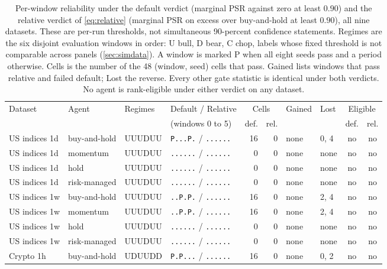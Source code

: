 \begin{table}[t]
\centering
\footnotesize
\caption{Per-window reliability under the default verdict (marginal PSR against zero at least $0.90$) and the relative verdict of \cref{eq:relative} (marginal PSR on excess over buy-and-hold at least $0.90$), all nine datasets. These are per-run thresholds, not simultaneous 90-percent confidence statements. Regimes are the six disjoint evaluation windows in order: U bull, D bear, C chop, labels whose fixed threshold is not comparable across panels (\cref{sec:simdata}). A window is marked P when all eight seeds pass and a period otherwise. Cells is the number of the 48 (window, seed) cells that pass. Gained lists windows that pass relative and failed default; Lost the reverse. Every other gate statistic is identical under both verdicts. No agent is rank-eligible under either verdict on any dataset.}
\label{tab:relative}
\setlength{\tabcolsep}{4pt}
\begin{tabular}{llllrrllcc}
\toprule
Dataset & Agent & Regimes & Default / Relative & \multicolumn{2}{c}{Cells} & Gained & Lost & \multicolumn{2}{c}{Eligible} \\
 & & & (windows 0 to 5) & {def.} & {rel.} & & & def. & rel. \\
\midrule
US indices 1d & buy-and-hold & UUUDUU & \texttt{P...P.} / \texttt{......} & 16 & 0 & none & 0, 4 & no & no \\
US indices 1d & momentum & UUUDUU & \texttt{......} / \texttt{......} & 0 & 0 & none & none & no & no \\
US indices 1d & hold & UUUDUU & \texttt{......} / \texttt{......} & 0 & 0 & none & none & no & no \\
US indices 1d & risk-managed & UUUDUU & \texttt{......} / \texttt{......} & 0 & 0 & none & none & no & no \\
US indices 1w & buy-and-hold & UUUDUU & \texttt{..P.P.} / \texttt{......} & 16 & 0 & none & 2, 4 & no & no \\
US indices 1w & momentum & UUUDUU & \texttt{..P.P.} / \texttt{......} & 16 & 0 & none & 2, 4 & no & no \\
US indices 1w & hold & UUUDUU & \texttt{......} / \texttt{......} & 0 & 0 & none & none & no & no \\
US indices 1w & risk-managed & UUUDUU & \texttt{......} / \texttt{......} & 0 & 0 & none & none & no & no \\
Crypto 1h & buy-and-hold & UDUUDD & \texttt{P.P...} / \texttt{......} & 16 & 0 & none & 0, 2 & no & no \\

\end{tabular}
\end{table}
